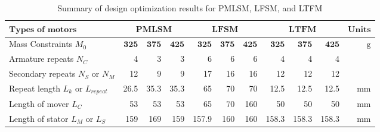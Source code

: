         
        \begin{landscape}
            \begin{table}[]
                \renewcommand{\arraystretch}{1.2}
                \caption{Summary of design optimization results for PMLSM, LFSM, and LTFM}
                \label{table:chap/rsm/overall optimization results}
                \begin{tabular}{l|rrr|rrr|rrr|r}
                \hline
                \multicolumn{1}{l|}{$\textbf{Types of motors}$}                         & \multicolumn{3}{c|}{$\textbf{PMLSM}$}            & \multicolumn{3}{c|}{$\textbf{LFSM}$}             & \multicolumn{3}{c|}{$\textbf{LTFM}$}             &  {$\textbf{Units}$}              \\ 
                \hline
                Mass Constraints $M_0$                                       & $\textbf{325}$ & $\textbf{375}$ & $\textbf{425}$ & $\textbf{325}$ & $\textbf{375}$ & $\textbf{425}$ & $\textbf{325}$ & $\textbf{375}$ & $\textbf{425}$ & $\mathrm{g}$   \\
                Armature repeats $N_C$                                       & 4              & 3              & 3              & 6              & 6              & 6              & 4              & 4              & 4              &                \\
                Secondary repeats $N_S$ or $N_M$                             & 12             & 9              & 9              & 17             & 16             & 16             & 12             & 12             & 12             &                \\
                Repeat length $L_k$ or $L_{repeat}$                          & 26.5           & 35.3           & 35.3           & 65             & 70             & 70             & 12.5           & 12.5           & 12.5           & \multicolumn{1}{r}{$\mathrm{mm}$} \\
                Length of mover $L_C$                                        & 53             & 53             & 53             & 65             & 70             & 160            & 50             & 50             & 50             & \multicolumn{1}{r}{$\mathrm{mm}$} \\
                Length of stator $L_M$ or $L_S$                              & 159            & 169            & 159            & 157.9          & 160            & 160            & 158.3          & 158.3          & 158.3          & \multicolumn{1}{r}{$\mathrm{mm}$} \\

\end{tabular}
\end{table}
\end{landscape}
